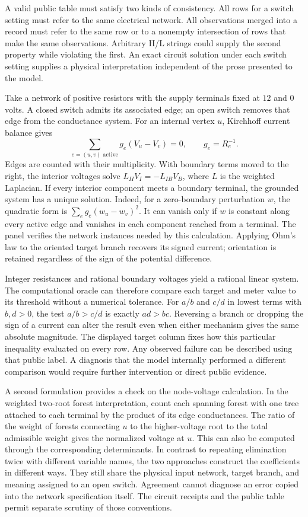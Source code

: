 \documentclass[12pt,letterpaper]{article}
\begin{document}
A valid public table must satisfy two kinds of consistency. All rows for a switch setting must refer to the same electrical network. All observations merged into a record must refer to the same row or to a nonempty intersection of rows that make the same observations. Arbitrary H/L strings could supply the second property while violating the first. An exact circuit solution under each switch setting supplies a physical interpretation independent of the prose presented to the model.

Take a network of positive resistors with the supply terminals fixed at $12$ and $0$ volts. A closed switch admits its associated edge; an open switch removes that edge from the conductance system. For an internal vertex $u$, Kirchhoff current balance gives
\[
 \sum_{e=(u,v)\text{ active}}g_e(V_u-V_v)=0,\qquad g_e=R_e^{-1}.
\]
Edges are counted with their multiplicity. With boundary terms moved to the right, the interior voltages solve $L_{II}V_I=-L_{IB}V_B$, where $L$ is the weighted Laplacian. If every interior component meets a boundary terminal, the grounded system has a unique solution. Indeed, for a zero-boundary perturbation $w$, the quadratic form is $\sum_e g_e(w_u-w_v)^2$. It can vanish only if $w$ is constant along every active edge and vanishes in each component reached from a terminal. The panel verifies the network instances needed by this calculation. Applying Ohm's law to the oriented target branch recovers its signed current; orientation is retained regardless of the sign of the potential difference.

Integer resistances and rational boundary voltages yield a rational linear system. The computational oracle can therefore compare each target and meter value to its threshold without a numerical tolerance. For $a/b$ and $c/d$ in lowest terms with $b,d>0$, the test $a/b>c/d$ is exactly $ad>bc$. Reversing a branch or dropping the sign of a current can alter the result even when either mechanism gives the same absolute magnitude. The displayed target column fixes how this particular inequality evaluated on every row. Any observed failure can be described using that public label. A diagnosis that the model internally performed a different comparison would require further intervention or direct public evidence.

A second formulation provides a check on the node-voltage calculation. In the weighted two-root forest interpretation, count each spanning forest with one tree attached to each terminal by the product of its edge conductances. The ratio of the weight of forests connecting $u$ to the higher-voltage root to the total admissible weight gives the normalized voltage at $u$. This can also be computed through the corresponding determinants. In contrast to repeating elimination twice with different variable names, the two approaches construct the coefficients in different ways. They still share the physical input network, target branch, and meaning assigned to an open switch. Agreement cannot diagnose an error copied into the network specification itself. The circuit receipts and the public table permit separate scrutiny of those conventions.
\end{document}
